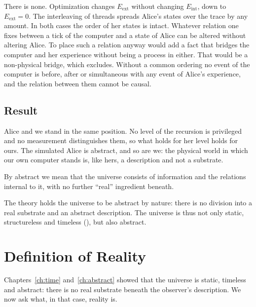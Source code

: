\documentclass[11pt]{book}
\begin{document}
There is none. Optimization changes $E_{\mathrm{ext}}$ without changing
$E_{\mathrm{int}}$, down to $E_{\mathrm{ext}} = 0$. The interleaving of
threads spreads Alice's states over the trace by any amount. In both cases
the order of her states is intact. Whatever relation one fixes between a
tick of the computer and a state of Alice can be altered without altering
Alice. To place such a relation anyway would add a fact that bridges the
computer and her experience without being a process in either. That would
be a non-physical bridge, which  excludes. Without a common
ordering no event of the computer is before, after or simultaneous with any
event of Alice's experience, and the relation between them cannot be
causal.


\section{Result}

Alice and we stand in the same position. No level of the recursion is
privileged and no measurement distinguishes them, so what holds for her
level holds for ours. The simulated Alice is abstract, and so are we: the
physical world in which our own computer stands is, like hers, a
description and not a substrate.

By abstract we mean that the universe consists of information and the
relations internal to it, with no further ``real'' ingredient beneath.


\begin{deduction}\label{ded:abstract}
  The theory holds the universe to be abstract by nature: there is no
  division into a real substrate and an abstract description. The universe
  is thus not only static, structureless and timeless
  (), but also abstract.
\end{deduction}




\providecommand{\added}[1]{{\color{blue}#1}}

\chapter{Definition of Reality}
\label{ch:reality}

Chapters~\ref{ch:time} and~\ref{ch:abstract} showed that the universe is
static, timeless and abstract: there is no real substrate beneath the
observer's description. We now ask what, in that case, reality is.
\end{document}
